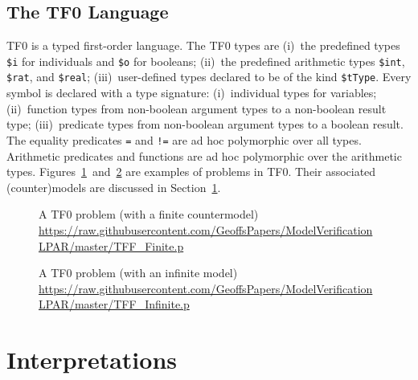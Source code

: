 \documentclass{easychair}
\newcommand{\smalltt}[1]{\small \texttt{#1}}
\begin{document}
\subsection{The TF0 Language}
\label{TF0}

TF0 is a typed first-order language.
The TF0 types are
(i)~the predefined types {\smalltt{\$i}} for individuals and {\smalltt{\$o}} for booleans; 
(ii)~the predefined arithmetic types {\smalltt{\$int}}, {\smalltt{\$rat}}, and {\smalltt{\$real}}; 
(iii)~user-defined types declared to be of the kind {\smalltt{\$tType}}.
Every symbol is declared with a type signature:
(i)~individual types for variables;
(ii)~function types from non-boolean argument types to a non-boolean result type;
(iii)~predicate types from non-boolean argument types to a boolean result.
The equality predicates {\tt =} and {\tt !=} are ad hoc polymorphic over all types. 
Arithmetic predicates and functions are ad hoc polymorphic over the arithmetic types.
Figures~\ref{TF0FiniteProblem}~and~\ref{TF0InfiniteProblem} are examples of problems in TF0.  Their associated (counter)models are discussed in Section~\ref{Interpretations}.

\begin{figure}[htbp]
\small
{}

\caption{A TF0 problem (with a finite countermodel)\\
{\footnotesize \url{https://raw.githubusercontent.com/GeoffsPapers/ModelVerificationLPAR/master/TFF_Finite.p}}}
\label{TF0FiniteProblem}
\end{figure}

\begin{figure}[htbp]
\small
{}

\caption{A TF0 problem (with an infinite model)\\
{\footnotesize \url{https://raw.githubusercontent.com/GeoffsPapers/ModelVerificationLPAR/master/TFF_Infinite.p}}}
\label{TF0InfiniteProblem}
\end{figure}

\section{Interpretations}
\label{Interpretations}
\end{document}
